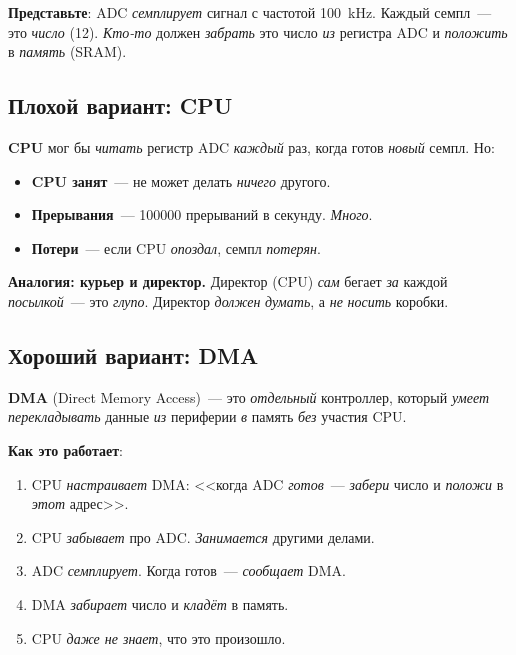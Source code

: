 \textbf{Представьте}: ADC \emph{семплирует} сигнал с
частотой \SI{100}{\kilo\hertz}. Каждый семпл~--- это
\emph{число} (\SI{12}{\bit}). \emph{Кто-то} должен
\emph{забрать} это число \emph{из} регистра ADC и
\emph{положить} в \emph{память} (SRAM).

\subsection{Плохой вариант: CPU}

\textbf{CPU} мог бы \emph{читать} регистр ADC \emph{каждый}
раз, когда готов \emph{новый} семпл. Но:

\begin{itemize}
    \item \textbf{CPU занят}~--- не может делать \emph{ничего}
          другого.
    \item \textbf{Прерывания}~--- \num{100000} прерываний
          в секунду. \emph{Много}.
    \item \textbf{Потери}~--- если CPU \emph{опоздал},
          семпл \emph{потерян}.
\end{itemize}

\begin{warnbox}
\textbf{Аналогия: курьер и директор.} Директор (CPU)
\emph{сам} бегает \emph{за} каждой \emph{посылкой}~---
это \emph{глупо}. Директор \emph{должен} \emph{думать},
а \emph{не} \emph{носить} коробки.
\end{warnbox}

\subsection{Хороший вариант: DMA}

\textbf{DMA} (Direct Memory Access)~--- это \emph{отдельный}
контроллер, который \emph{умеет} \emph{перекладывать}
данные \emph{из} периферии \emph{в} память \emph{без}
участия CPU.

\textbf{Как это работает}:
\begin{enumerate}
    \item CPU \emph{настраивает} DMA: <<когда ADC
          \emph{готов}~--- \emph{забери} число и \emph{положи}
          в \emph{этот} адрес>>.
    \item CPU \emph{забывает} про ADC. \emph{Занимается}
          другими делами.
    \item ADC \emph{семплирует}. Когда готов~--- \emph{сообщает}
          DMA.
    \item DMA \emph{забирает} число и \emph{кладёт} в память.
    \item CPU \emph{даже не знает}, что это произошло.
\end{enumerate}

